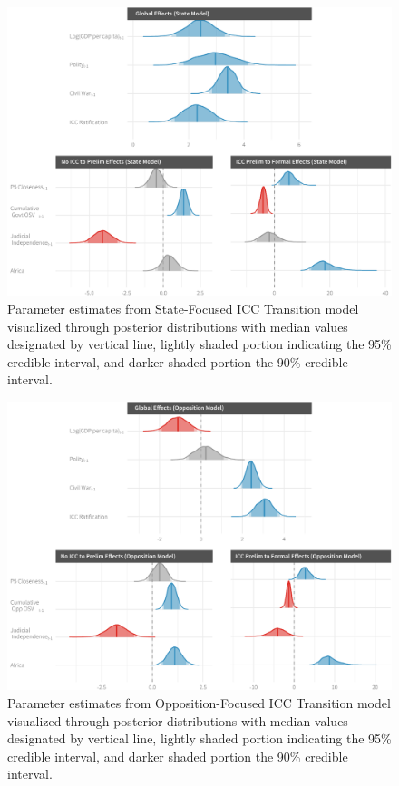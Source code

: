 \begin{figure}
    \centering
    \includegraphics[width=1\textwidth]{iccPaper/stateCoefSumm.pdf}
    \caption{Parameter estimates from State-Focused ICC Transition model visualized through posterior distributions with median values designated by vertical line, lightly shaded portion indicating the 95\% credible interval, and darker shaded portion the 90\% credible interval.}
    \label{fig:stateModel}
\end{figure}

\begin{figure}
    \centering
    \includegraphics[width=1\textwidth]{iccPaper/rebelCoefSumm.pdf}
    \caption{Parameter estimates from Opposition-Focused ICC Transition model visualized through posterior distributions with median values designated by vertical line, lightly shaded portion indicating the 95\% credible interval, and darker shaded portion the 90\% credible interval.}
    \label{fig:rebelModel}
\end{figure}

